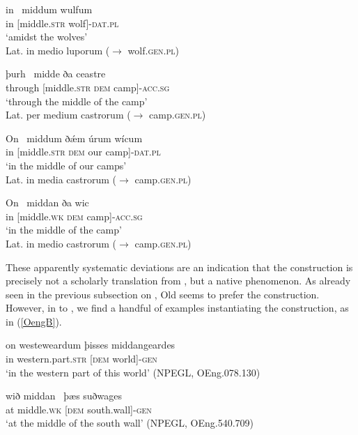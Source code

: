 \documentclass[output=paper,colorlinks,citecolor=brown]{langscibook}
\begin{document}
\begin{exe}
   \ex \label{OengA}   
    \begin{xlist}

     \ex \gll  in   {\ middum}  wulfum   \\  
      in  [middle.\textsc{str}   wolf]-\textsc{dat.pl}  \\  
      \glt `amidst the wolves' \\ 
      \glt Lat. in medio luporum  ($\rightarrow$ wolf.\textsc{gen.pl}) 

     \ex \gll  þurh  {\ midde}  ða ceastre   \\  
      through  [middle.\textsc{str} \textsc{dem} camp]-\textsc{acc.sg}  \\  
      \glt `through the middle of the camp' \\ 
      \glt Lat. per medium castrorum  ($\rightarrow$ camp.\textsc{gen.pl}) 
          
     \ex \gll  On {\ middum}  ð\'æm úrum wícum   \\ 
     in [middle.\textsc{str} \textsc{dem} our camp]-\textsc{dat.pl}   \\  
     \glt `in the middle of our camps' \\ 
      \glt Lat. in media castrorum  ($\rightarrow$ camp.\textsc{gen.pl}) 
  
     \ex \label{OengAd} \gll  On {\ middan}  ða wic   \\  
     in [middle.\textsc{wk} \textsc{dem} camp]-\textsc{acc.sg}   \\  
     \glt `in the middle of the camp' \\ 
      \glt  Lat. in medio castrorum ($\rightarrow$ camp.\textsc{gen.pl})

   \end{xlist}
\end{exe} 

These apparently systematic deviations are an indication that the construction is precisely not a scholarly translation from , but a native phenomenon. As already seen in the previous subsection on , Old  seems to prefer the  construction. However, in  to , we find a handful of examples instantiating the  construction, as in (\ref{OengB}).

\begin{exe}
   \ex \label{OengB}   
    \begin{xlist}
     \ex \label{OengBa} \gll  on  westeweardum   { þisses} middangeardes   \\  
     in western.part.\textsc{str}   [\textsc{dem} world]-\textsc{gen}  \\
     \glt `in the western part of this world' (NPEGL, OEng.078.130)

     \ex \label{OengBb}  \gll  wið  middan {\ þæs} suðwages   \\  
       at middle.\textsc{wk}  [\textsc{dem} south.wall]-\textsc{gen}  \\ 
     \glt `at the middle of the south wall' (NPEGL, OEng.540.709)

   \end{xlist}
\end{exe} 
\end{document}
